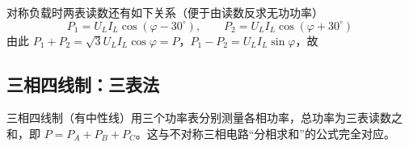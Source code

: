 对称负载时两表读数还有如下关系（便于由读数反求无功功率）
\begin{equation}
P_1=U_LI_L\cos\left(\varphi-30^\circ\right),\qquad
P_2=U_LI_L\cos\left(\varphi+30^\circ\right)
\end{equation}
由此 $P_1+P_2=\sqrt{3}U_LI_L\cos\varphi=P$，$P_1-P_2=U_LI_L\sin\varphi$，故

\subsection{三相四线制：三表法}
三相四线制（有中性线）用三个功率表分别测量各相功率，总功率为三表读数之和，即 $P=P_A+P_B+P_C$。这与不对称三相电路“分相求和”的公式完全对应。


\endinput
